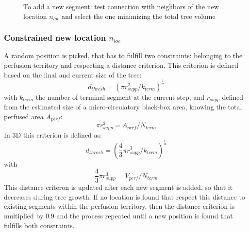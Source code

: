 \documentclass[a4paper, 11pt]{article} %
\begin{document}
\begin{figure}[!h]
\centering
{}
\caption{To add a new segment: test connection with neighbors of the new location $n_{loc}$ and select the one minimizing the total tree volume}
\label{fig:test neighbors}
\end{figure}

\subsubsection{Constrained new location $n_{loc}$}
A random position is picked, that has to fulfill two constraints: belonging to the perfusion territory and respecting a distance criterion. 
This criterion is defined based on the final and current size of the tree:
\begin{equation}
d_{thresh} = (\pi r_{supp}^2 / k_{term})^\frac{1}{2}
\end{equation}
with $k_{term}$ the number of terminal segment at the current step, and $r_{supp}$ defined from  the estimated size of a micro-circulatory black-box area, knowing the total perfused area $A_{perf}$:
\begin{equation}
\pi r_{supp}^2 = A_{perf} / N_{term}
\end{equation}
In 3D this criterion is defined as:
\begin{equation}
d_{thresh} = (\frac{4}{3} \pi r_{supp}^3 / k_{term})^\frac{1}{3}
\end{equation}
with
\begin{equation}
\frac{4}{3}\pi r_{supp}^3 = V_{perf} / N_{term}
\end{equation}
This distance criteron is updated after each new segment is added, so that it decreases during tree growth. If no location is found that respect this distance to existing segments within the perfusion territory, then the distance criterion is multiplied by 0.9 and the process repeated until a new position is found that fulfills both constraints. 
\end{document}
